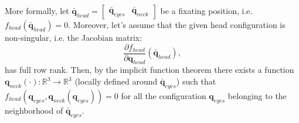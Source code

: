 More formally, let $\bar {\mathbf q}_{head} = \begin{bmatrix} \bar 
{\mathbf q}_{eyes} & \bar {\mathbf q}_{neck} \end{bmatrix}$ 
be a fixating position, i.e. $f_{head}(\bar {\mathbf q}_{head}) = 0$. 
Moreover, let's assume that the given head configuration is non-singular, 
i.e. the Jacobian matrix: $$\frac{\partial f_{head}}{\partial \mathbf 
q_{head}}(\bar {\mathbf q}_{head}),$$ has full row rank. Then, by the 
implicit function theorem there exists a function 
$\mathbf q_{neck}(\cdot): \mathbb R^3 \longrightarrow \mathbb R^3$ 
(locally defined around $\bar {\mathbf q}_{eyes}$) such that 
$f_{head}({\mathbf q}_{eyes}, {\mathbf q}_{neck} ({\mathbf q}_{eyes}) ) = 0$ 
for all the configuration ${\mathbf q}_{eyes}$ belonging to the neighborhood 
of $\bar {\mathbf q}_{eyes}$.